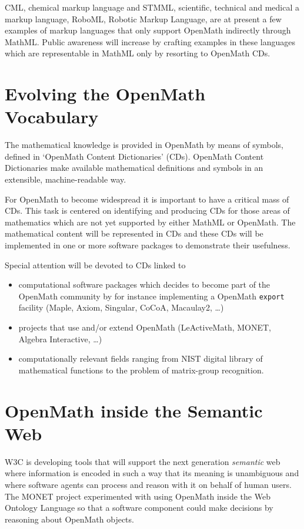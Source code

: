 \documentclass[draft]{artikel3}
\begin{document}
CML, chemical markup language and STMML, scientific, technical and
medical a markup language, RoboML, Robotic Markup Language, are at
present a few examples of markup languages that only support OpenMath
indirectly through MathML.  Public awareness will increase by crafting
examples in these languages which are representable in MathML only by
resorting to OpenMath CDs.

\section{Evolving the OpenMath Vocabulary}
\label{sec:OCD}

The mathematical knowledge is provided in OpenMath by means of
symbols, defined in `OpenMath Content Dictionaries' (CDs).  OpenMath
Content Dictionaries make available mathematical definitions and
symbols in an extensible, machine-readable way.

For OpenMath to become widespread it is important to have a critical
mass of CDs. This task is centered on identifying and producing CDs
for those areas of mathematics which are not yet supported by either
MathML or OpenMath. The mathematical content will be represented in
CDs and these CDs will be implemented in one or more software packages
to demonstrate their usefulness.

Special attention will be devoted to CDs linked to 
\begin{itemize}
  
\item computational software packages which decides to become part of
  the OpenMath community by for instance implementing a OpenMath
  \texttt{export} facility (Maple, Axiom, Singular, CoCoA, Macaulay2,
  \ldots)
  
\item projects that use and/or extend OpenMath (LeActiveMath, MONET,
  Algebra Interactive, \ldots)
  
\item computationally relevant fields ranging from NIST digital
  library of mathematical functions to the problem of matrix-group
  recognition.

\end{itemize}

\section{OpenMath inside the Semantic Web}

W3C is developing tools that will support the next generation
\emph{semantic} web where information is encoded in such a way that
its meaning is unambiguous and where software agents can process and
reason with it on behalf of human users.  The MONET project
experimented with using OpenMath inside the Web Ontology Language so
that a software component could make decisions by reasoning about
OpenMath objects.
\end{document}
